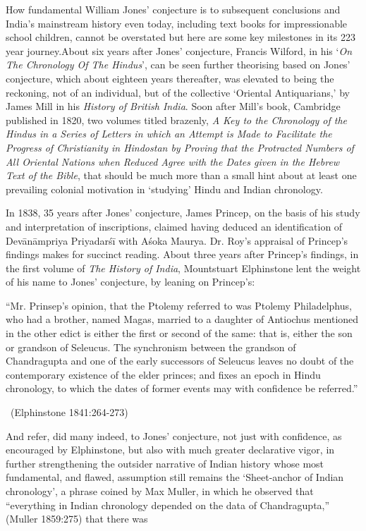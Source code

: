 How fundamental William Jones’ conjecture is to subsequent conclusions and India’s mainstream history even today, including text books for impressionable school children, cannot be overstated but here are some key milestones in its 223 year journey.About six years after Jones’ conjecture, Francis Wilford, in his ‘\textit{On The Chronology Of The Hindus}’, can be seen further theorising based on Jones’ conjecture, which about eighteen years thereafter, was elevated to being the reckoning, not of an individual, but of the collective ‘Oriental Antiquarians,’ by James Mill in his \textit{History of British India}. Soon after Mill’s book, Cambridge published in 1820, two volumes titled brazenly, \textit{A Key to the Chronology of the Hindus in a Series of Letters in which an Attempt is Made to Facilitate the Progress of Christianity in Hindostan by Proving that the Protracted Numbers of All Oriental Nations when Reduced Agree with the Dates given in the Hebrew Text of the Bible}, that should be much more than a small hint about at least one prevailing colonial motivation in ‘studying’ Hindu and Indian chronology.

In 1838, 35 years after Jones’ conjecture, James Princep, on the basis of his study and interpretation of inscriptions, claimed having deduced an identification of Devānāmpriya Priyadarśī with Aśoka Maurya. Dr. Roy’s appraisal of Princep’s findings makes for succinct reading. About three years after Princep’s findings, in the first volume of \textit{The History of India}, Mountstuart Elphinstone lent the weight of his name to Jones’ conjecture, by leaning on Princep’s:

\begin{myquote}
“Mr. Prinsep’s opinion, that the Ptolemy referred to was Ptolemy Philadelphus, who had a brother, named Magas, married to a daughter of Antiochus mentioned in the other edict is either the first or second of the same: that is, either the son or grandson of Seleucus. The synchronism between the grandson of Chandragupta and one of the early successors of Seleucus leaves no doubt of the contemporary existence of the elder princes; and fixes an epoch in Hindu chronology, to which the dates of former events may with confidence be referred.” 

~\hfill (Elphinstone 1841:264-273)
\end{myquote}

And refer, did many indeed, to Jones’ conjecture, not just with confidence, as encouraged by Elphinstone, but also with much greater declarative vigor, in further strengthening the outsider narrative of Indian history whose most fundamental, and flawed, assumption still remains the ‘Sheet-anchor of Indian chronology’, a phrase coined by Max Muller, in which he observed that “everything in Indian chronology depended on the data of Chandragupta,” (Muller 1859:275) that there was

